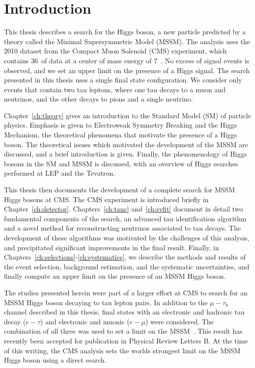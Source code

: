 \ifx\master\undefined\fi
\chapter*{Introduction} 

This thesis describes a search for the Higgs boson, a new particle predicted by
a theory called the Minimal Supersymmetric Model (MSSM).  The analysis uses the
2010 dataset from the Compact Muon Solenoid (CMS) experiment,
which contains 36~\pbinv of data at a center of mass energy of 7~\TeV.  No
excess of signal events is observed, and we set an upper limit on the
presence of a Higgs signal.  The search presented in this thesis
uses a single final state configuration.  We consider only events
that contain two tau leptons, where one tau decays to a muon and neutrinos,  and
the other decays to pions and a single neutrino.   

Chapter~\ref{ch:theory} gives an introduction to the Standard Model (SM) of
particle physics. Emphasis is given to Electroweak Symmetry Breaking and the
Higgs Mechanism, the theoretical phenomena that motivate the presence of a Higgs
boson.  The theoretical issues which motivated the development of the MSSM are
discussed, and a brief introduction is given. Finally, the phenomenology of
Higgs bosons in the SM and MSSM is discussed, with an overview of Higgs searches
performed at LEP and the Tevatron.

This thesis then documents the development of a complete search for MSSM Higgs
bosons at CMS\@.  The CMS experiment is introduced briefly in
Chapter~\ref{ch:detector}. Chapters~\ref{ch:tanc} and~\ref{ch:svfit} document in
detail two fundamental components of the search, an advanced tau identification
algorithm and a novel method for reconstructing neutrinos associated to tau
decays.  The development of these algorithms was motivated by the challenges of
this analysis, and precipitated significant improvements in the final result.
Finally, in \mbox{Chapters~\ref{ch:selections}-\ref{ch:systematics}}, we
describe the methods and results of the event selection, background estimation,
and the systematic uncertainties, and finally compute an upper limit on the
presence of an MSSM Higgs boson.

The studies presented herein were part of a larger effort at CMS to search for
an MSSM Higgs boson decaying to tau lepton pairs.  In addition to the
$\mu-\tau_h$ channel described in this thesis, final states with an electronic
and hadronic tau decay ($e-\tau$) and electronic and muonic ($e-\mu$) were
considered.  The combination of all three was used to set a limit on the
MSSM~\cite{HIG-10-002}.  This result has recently been accepted for publication
in Physical Review Letters B.  At the time of this writing, the CMS analysis
sets the worlds strongest limit on the MSSM Higgs boson using a direct search.

\ifx\master\undefined\fi
